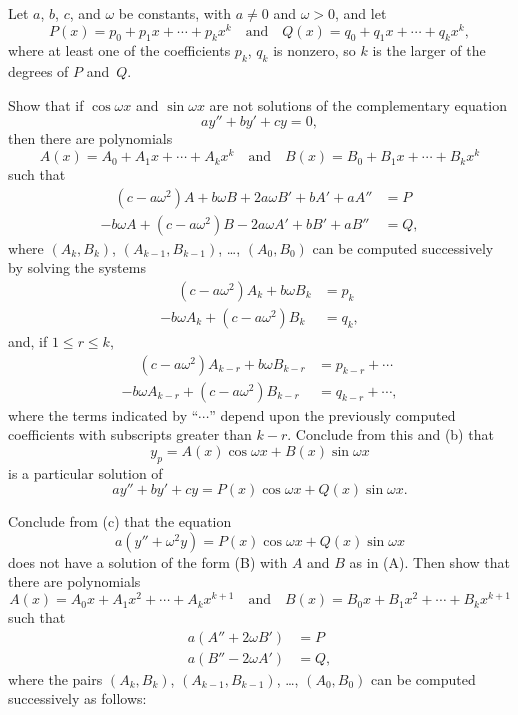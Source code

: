 \begin{exerciselist}
\item\label{exer:5.5.37}Let $a$, $b$, $c$, and $\omega$ be constants, with $a\ne0$ and
$\omega>0$, and let
\[
P(x)=p_0+p_1x+\cdots+p_kx^k \quad\text{and}\quad 
Q(x)=q_0+q_1x+\cdots+q_kx^k,
\]
where at least one of the coefficients $p_k$, $q_k$ is nonzero, so
 $k$  is the larger of the degrees of $P$ and~$Q$.
\begin{alist}
\item %
Show that if $\cos\omega x$ and $\sin\omega x$
are not solutions of the complementary equation
\[
ay''+by'+cy=0,
\]
then  there are polynomials
\[
A(x)=A_0+A_1x+\cdots+A_kx^k \quad\text{and}\quad 
B(x)=B_0+B_1x+\cdots+B_kx^k
\tag{A}
\]
such that
\begin{align*}
\quad (c-a\omega^2)A+b\omega B+2a\omega B'+bA'+aA''&=P\phantom{.}\\
-b\omega A+(c-a\omega^2)B-2a\omega A'+bB'+aB''&=Q,
\end{align*}
where $(A_k,B_k)$, $(A_{k-1},B_{k-1})$, \dots, $(A_0,B_0)$ can be computed
successively by solving the systems
\begin{align*}
\phantom{-}(c-a\omega^2)A_k+b\omega B_k&=p_k\phantom{.}\\
-b\omega A_k+(c-a\omega^2)B_k&=q_k,
\end{align*}
and, if $1\le r\le k$,
\begin{align*}
\phantom{-}(c-a\omega^2)A_{k-r}+b\omega B_{k-r}&=p_{k-r}+\cdots\phantom{.}\\
-b\omega A_{k-r}+(c-a\omega^2)B_{k-r}&=q_{k-r}+\cdots,
\end{align*}
where the terms indicated by ``$\cdots$'' depend upon the previously
computed coefficients with subscripts greater than $k-r$.
Conclude from this and (b) that
\[
y_p=A(x)\cos\omega x+B(x)\sin\omega x
\tag{B}
\]
 is a particular solution of
\[
ay''+by'+cy=P(x)\cos\omega x+Q(x)\sin\omega x.
\]
\item %
Conclude from (c)
 that the equation
\[
a(y''+\omega^2 y)=P(x)\cos\omega x+Q(x)\sin\omega x
\tag{C}
\]
does not have a solution of the form (B) with  $A$
and $B$ as in (A). Then show that there are
polynomials
\[
A(x)=A_0x+A_1x^2+\cdots+A_kx^{k+1}\quad\text{and}\quad 
 B(x)=B_0x+B_1x^2+\cdots+B_kx^{k+1}
\]
such that
\begin{align*}
a(A''+2\omega B')&=P\\
a(B''-2\omega A')&=Q,
\end{align*}
where the pairs $(A_k,B_k)$, $(A_{k-1},B_{k-1})$, \dots, $(A_0,B_0)$ can be
computed successively as follows:

\end{alist}
\end{exerciselist}

